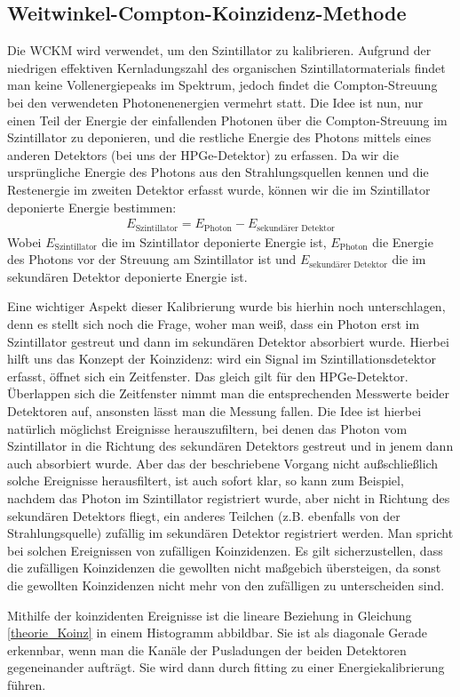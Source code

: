 \subsection{Weitwinkel-Compton-Koinzidenz-Methode}

Die WCKM wird verwendet, um den Szintillator zu kalibrieren. Aufgrund der niedrigen effektiven Kernladungszahl des organischen Szintillatormaterials findet man keine Vollenergiepeaks im Spektrum, jedoch findet die Compton-Streuung bei den verwendeten Photonenenergien vermehrt statt. Die Idee ist nun, nur einen Teil der Energie der einfallenden Photonen über die Compton-Streuung im Szintillator zu deponieren, und die restliche Energie des Photons mittels eines anderen Detektors (bei uns der HPGe-Detektor) zu erfassen. Da wir die ursprüngliche Energie des Photons aus den Strahlungsquellen kennen und die Restenergie im zweiten Detektor erfasst wurde, können wir die im Szintillator deponierte Energie bestimmen:
\begin{gather}
    E_{\text{Szintillator}} = E_{\text{Photon}} - E_{\text{sekundärer Detektor}}
    \label{theorie_Koinz}
\end{gather}
Wobei $E_{\text{Szintillator}}$ die im Szintillator deponierte Energie ist, $E_{\text{Photon}}$ die Energie des Photons vor der Streuung am Szintillator ist und $E_{\text{sekundärer Detektor}}$ die im sekundären Detektor deponierte Energie ist.

Eine wichtiger Aspekt dieser Kalibrierung wurde bis hierhin noch unterschlagen, denn es stellt sich noch die Frage, woher man weiß, dass ein Photon erst im Szintillator gestreut und dann im sekundären Detektor absorbiert wurde. Hierbei hilft uns das Konzept der Koinzidenz: wird ein Signal im Szintillationsdetektor erfasst, öffnet sich ein Zeitfenster. Das gleich gilt für den HPGe-Detektor. Überlappen sich die Zeitfenster nimmt man die entsprechenden Messwerte beider Detektoren auf, ansonsten lässt man die Messung fallen. Die Idee ist hierbei natürlich möglichst Ereignisse herauszufiltern, bei denen das Photon vom Szintillator in die Richtung des sekundären Detektors gestreut und in jenem dann auch absorbiert wurde. Aber das der beschriebene Vorgang nicht außschließlich solche Ereignisse herausfiltert, ist auch sofort klar, so kann zum Beispiel, nachdem das Photon im Szintillator registriert wurde, aber nicht in Richtung des sekundären Detektors fliegt, ein anderes Teilchen (z.B. ebenfalls von der Strahlungsquelle) zufällig im sekundären Detektor registriert werden. Man spricht bei solchen Ereignissen von zufälligen Koinzidenzen. Es gilt sicherzustellen, dass die zufälligen Koinzidenzen die gewollten nicht maßgebich übersteigen, da sonst die gewollten Koinzidenzen nicht mehr von den zufälligen zu unterscheiden sind.

Mithilfe der koinzidenten Ereignisse ist die lineare Beziehung in Gleichung \ref{theorie_Koinz} in einem Histogramm abbildbar. Sie ist als diagonale Gerade erkennbar, wenn man die Kanäle der Pusladungen der beiden Detektoren gegeneinander aufträgt. Sie wird dann durch fitting zu einer Energiekalibrierung führen.

